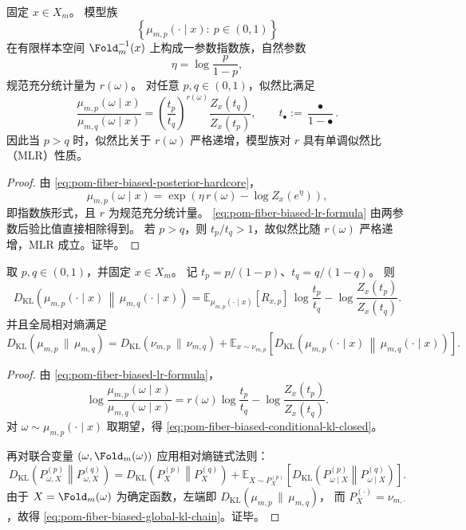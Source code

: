 \begin{proposition}\label{prop:pom-fiber-biased-posterior-mlr}
固定 \(x\in X_m\)。
模型族
\[
\left\{\mu_{m,p}(\cdot\mid x):\ p\in(0,1)\right\}
\]
在有限样本空间 \(\Fold_m^{-1}(x)\) 上构成一参数指数族，自然参数
\[
\eta=\log\frac{p}{1-p},
\]
规范充分统计量为 \(r(\omega)\)。
对任意 \(p,q\in(0,1)\)，似然比满足
\begin{equation}\label{eq:pom-fiber-biased-lr-formula}
\frac{\mu_{m,p}(\omega\mid x)}{\mu_{m,q}(\omega\mid x)}
=
\left(\frac{t_p}{t_q}\right)^{r(\omega)}
\frac{Z_x(t_q)}{Z_x(t_p)},
\qquad
t_\bullet:=\frac{\bullet}{1-\bullet}.
\end{equation}
因此当 \(p>q\) 时，似然比关于 \(r(\omega)\) 严格递增，模型族对 \(r\) 具有单调似然比（MLR）性质。
\end{proposition}
\begin{proof}
由 \eqref{eq:pom-fiber-biased-posterior-hardcore}，
\[
\mu_{m,p}(\omega\mid x)
=\exp\!\left(\eta\,r(\omega)-\log Z_x(e^\eta)\right),
\]
即指数族形式，且 \(r\) 为规范充分统计量。
\eqref{eq:pom-fiber-biased-lr-formula} 由两参数后验比值直接相除得到。
若 \(p>q\)，则 \(t_p/t_q>1\)，故似然比随 \(r(\omega)\) 严格递增，MLR 成立。证毕。
\end{proof}

\begin{theorem}\label{thm:pom-fiber-biased-conditional-kl-chain}
取 \(p,q\in(0,1)\)，并固定 \(x\in X_m\)。
记 \(t_p=p/(1-p)\)、\(t_q=q/(1-q)\)。
则
\begin{equation}\label{eq:pom-fiber-biased-conditional-kl-closed}
D_{\mathrm{KL}}\!\left(\mu_{m,p}(\cdot\mid x)\,\middle\|\,\mu_{m,q}(\cdot\mid x)\right)
=
\mathbb E_{\mu_{m,p}(\cdot\mid x)}[R_{x,p}]\,\log\frac{t_p}{t_q}
-\log\frac{Z_x(t_p)}{Z_x(t_q)}.
\end{equation}
并且全局相对熵满足
\begin{equation}\label{eq:pom-fiber-biased-global-kl-chain}
D_{\mathrm{KL}}(\mu_{m,p}\,\|\,\mu_{m,q})
=
D_{\mathrm{KL}}(\nu_{m,p}\,\|\,\nu_{m,q})
+
\mathbb E_{x\sim \nu_{m,p}}
\!\left[
D_{\mathrm{KL}}\!\left(\mu_{m,p}(\cdot\mid x)\,\middle\|\,\mu_{m,q}(\cdot\mid x)\right)
\right].
\end{equation}
\end{theorem}
\begin{proof}
由 \eqref{eq:pom-fiber-biased-lr-formula}，
\[
\log\frac{\mu_{m,p}(\omega\mid x)}{\mu_{m,q}(\omega\mid x)}
=
r(\omega)\log\frac{t_p}{t_q}
-\log\frac{Z_x(t_p)}{Z_x(t_q)}.
\]
对 \(\omega\sim\mu_{m,p}(\cdot\mid x)\) 取期望，得
\eqref{eq:pom-fiber-biased-conditional-kl-closed}。

再对联合变量 \((\omega,\Fold_m(\omega))\) 应用相对熵链式法则：
\[
D_{\mathrm{KL}}\!\left(P_{\omega,X}^{(p)}\middle\|P_{\omega,X}^{(q)}\right)
=
D_{\mathrm{KL}}\!\left(P_X^{(p)}\middle\|P_X^{(q)}\right)
+
\mathbb E_{X\sim P_X^{(p)}}
\left[D_{\mathrm{KL}}\!\left(P_{\omega\mid X}^{(p)}\middle\|P_{\omega\mid X}^{(q)}\right)\right].
\]
由于 \(X=\Fold_m(\omega)\) 为确定函数，左端即
\(
D_{\mathrm{KL}}(\mu_{m,p}\,\|\,\mu_{m,q})
\)，
而 \(P_X^{(\cdot)}=\nu_{m,\cdot}\)，故得
\eqref{eq:pom-fiber-biased-global-kl-chain}。证毕。
\end{proof}

